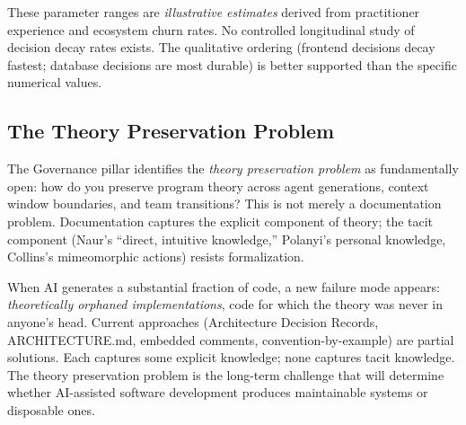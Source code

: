 These parameter ranges are \emph{illustrative estimates} derived from practitioner experience and ecosystem churn rates. No controlled longitudinal study of decision decay rates exists. The qualitative ordering (frontend decisions decay fastest; database decisions are most durable) is better supported than the specific numerical values.

\subsection{The Theory Preservation Problem}

The Governance pillar identifies the \emph{theory preservation problem} as fundamentally open: how do you preserve program theory across agent generations, context window boundaries, and team transitions? This is not merely a documentation problem. Documentation captures the explicit component of theory; the tacit component (Naur's ``direct, intuitive knowledge,'' Polanyi's personal knowledge, Collins's mimeomorphic actions) resists formalization.

When AI generates a substantial fraction of code, a new failure mode appears: \emph{theoretically orphaned implementations}, code for which the theory was never in anyone's head. Current approaches (Architecture Decision Records, ARCHITECTURE.md, embedded comments, convention-by-example) are partial solutions. Each captures some explicit knowledge; none captures tacit knowledge. The theory preservation problem is the long-term challenge that will determine whether AI-assisted software development produces maintainable systems or disposable ones.
